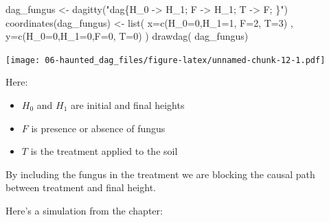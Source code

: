\documentclass[
]{book}
\newenvironment{Shaded}{\begin{snugshade}}{\end{snugshade}}
\newcommand{\AttributeTok}[1]{\textcolor[rgb]{0.77,0.63,0.00}{#1}}
\newcommand{\DecValTok}[1]{\textcolor[rgb]{0.00,0.00,0.81}{#1}}
\newcommand{\FunctionTok}[1]{\textcolor[rgb]{0.00,0.00,0.00}{#1}}
\newcommand{\NormalTok}[1]{#1}
\newcommand{\OtherTok}[1]{\textcolor[rgb]{0.56,0.35,0.01}{#1}}
\newcommand{\StringTok}[1]{\textcolor[rgb]{0.31,0.60,0.02}{#1}}
\providecommand{\tightlist}{%
  \setlength{\itemsep}{0pt}\setlength{\parskip}{0pt}}
\begin{document}
\begin{Shaded}
\begin{Highlighting}[]
\NormalTok{dag\_fungus }\OtherTok{\textless{}{-}} \FunctionTok{dagitty}\NormalTok{(}\StringTok{"dag\{H\_0 {-}\textgreater{} H\_1; F {-}\textgreater{} H\_1; T {-}\textgreater{} F; \}"}\NormalTok{)}
\FunctionTok{coordinates}\NormalTok{(dag\_fungus) }\OtherTok{\textless{}{-}} \FunctionTok{list}\NormalTok{( }\AttributeTok{x=}\FunctionTok{c}\NormalTok{(}\AttributeTok{H\_0=}\DecValTok{0}\NormalTok{,}\AttributeTok{H\_1=}\DecValTok{1}\NormalTok{, }\AttributeTok{F=}\DecValTok{2}\NormalTok{, }\AttributeTok{T=}\DecValTok{3}\NormalTok{) , }\AttributeTok{y=}\FunctionTok{c}\NormalTok{(}\AttributeTok{H\_0=}\DecValTok{0}\NormalTok{,}\AttributeTok{H\_1=}\DecValTok{0}\NormalTok{,}\AttributeTok{F=}\DecValTok{0}\NormalTok{, }\AttributeTok{T=}\DecValTok{0}\NormalTok{) )}
\FunctionTok{drawdag}\NormalTok{( dag\_fungus)}
\end{Highlighting}
\end{Shaded}

\texttt{[image: 06-haunted\_dag\_files/figure-latex/unnamed-chunk-12-1.pdf]}

Here:

\begin{itemize}
\tightlist
\item
  \(H_0\) and \(H_1\) are initial and final heights
\item
  \(F\) is presence or absence of fungus
\item
  \(T\) is the treatment applied to the soil
\end{itemize}

By including the fungus in the treatment we are blocking the causal path between treatment and final height.

Here's a simulation from the chapter:
\end{document}
